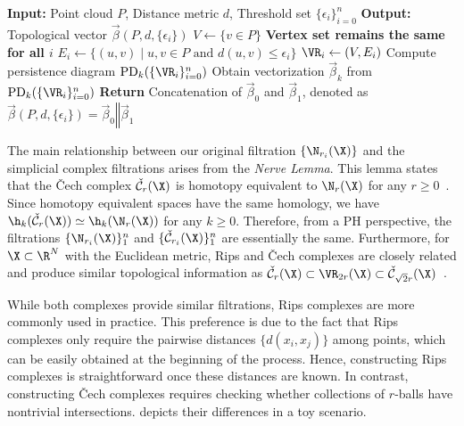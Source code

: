 \begin{algorithm}[b]
\caption{PH Machinery for Point Clouds with Rips Complexes \label{alg:PH_point}}
\begin{algorithmic}[1]
\State \textbf{Input:} Point cloud $P$, Distance metric $d$, Threshold set $\{\epsilon_i\}_{i=0}^n$
\State \textbf{Output:} Topological vector $\vec{\beta}(P, d, \{\epsilon_i\})$
\State $V \gets \{v \in P\}$ 
 
    \State \textbf{Vertex set remains the same for all $i$}
    \State $E_i \gets \{(u, v) \mid u, v \in P \text{ and } d(u, v) \leq \epsilon_i\}$ 
    \State $\VR_i \gets  (V, E_i)$ 
\EndFor
{} 
    \State Compute persistence diagram $\mathrm{PD}_k(\{\VR_i\}_{i=0}^n)$
    \State Obtain vectorization $\vec{\beta}_k$ from $\mathrm{PD}_k(\{\VR_i\}_{i=0}^n)$
\EndFor
\State \textbf{Return} Concatenation of $\vec{\beta}_0$ and $\vec{\beta}_1$, denoted as $\vec{\beta}(P, d, \{\epsilon_i\}) = \vec{\beta}_0 \mathbin\Vert \vec{\beta}_1$
\end{algorithmic}
\end{algorithm}

 




The main relationship between our original filtration $\{\N_{r_i}(\X)\}$ and the simplicial complex filtrations arises from the \textit{Nerve Lemma}. This lemma states that the \v{C}ech complex $\check{\mathcal{C}}_r(\X)$ is homotopy equivalent to $\N_r(\X)$ for any $r \geq 0$~\cite{dey2022computational}. Since homotopy equivalent spaces have the same homology, we have $\h_k(\check{\mathcal{C}}_r(\X)) \simeq \h_k(\N_r(\X))$ for any $k \geq 0$. Therefore, from a PH perspective, the filtrations $\{\N_{r_i}(\X)\}_1^n$ and $\{\check{\mathcal{C}}_{r_i}(\X)\}_1^n$ are essentially the same. Furthermore, for $\X \subset \R^N$ with the Euclidean metric, Rips and \v{C}ech complexes are closely related and produce similar topological information as  $\check{\mathcal{C}}_r(\X) \subset \VR_{2r}(\X) \subset \check{\mathcal{C}}_{\sqrt{2}r}(\X)$~\cite{edelsbrunner2022computational}.

While both complexes provide similar filtrations, Rips complexes are more commonly used in practice. This preference is due to the fact that Rips complexes only require the pairwise distances $\{d(x_i, x_j)\}$ among points, which can be easily obtained at the beginning of the process. Hence, constructing Rips complexes is straightforward once these distances are known. In contrast, constructing \v{C}ech complexes requires checking whether collections of $r$-balls have nontrivial intersections.  depicts their differences in a toy scenario.

